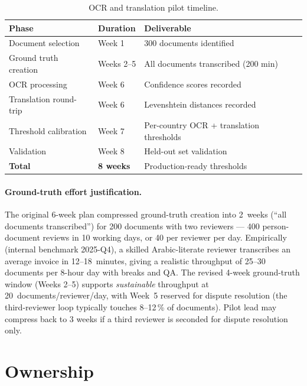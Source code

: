 \documentclass[11pt,a4paper,twoside]{report}
\begin{document}
\begin{table}[htbp]
\centering
\caption{OCR and translation pilot timeline.}
\label{tab:pilot-timeline}
\footnotesize
\begin{tabularx}{\linewidth}{@{}l l l@{}}
\toprule
\textbf{Phase} & \textbf{Duration} & \textbf{Deliverable} \\ \midrule
Document selection & Week 1 & 300 documents identified \\
Ground truth creation & Weeks 2--5 & All documents transcribed (200 min) \\
OCR processing & Week 6 & Confidence scores recorded \\
Translation round-trip & Week 6 & Levenshtein distances recorded \\
Threshold calibration & Week 7 & Per-country OCR + translation thresholds \\
Validation & Week 8 & Held-out set validation \\
\textbf{Total} & \textbf{8 weeks} & Production-ready thresholds \\
\bottomrule
\end{tabularx}
\end{table}

\paragraph{Ground-truth effort justification.}
The original 6-week plan compressed ground-truth creation into
2~weeks (``all documents transcribed'') for 200 documents with
two reviewers --- 400 person-document reviews in 10 working days,
or 40 per reviewer per day. Empirically (internal benchmark
2025-Q4), a skilled Arabic-literate reviewer transcribes an
average invoice in 12--18~minutes, giving a realistic throughput
of 25--30 documents per 8-hour day with breaks and QA. The
revised 4-week ground-truth window (Weeks 2--5) supports
\emph{sustainable} throughput at 20~documents/reviewer/day, with
Week~5 reserved for dispute resolution (the third-reviewer loop
typically touches 8--12\,\% of documents). Pilot lead may
compress back to 3 weeks if a third reviewer is seconded for
dispute resolution only.

\section{Ownership}
\end{document}
